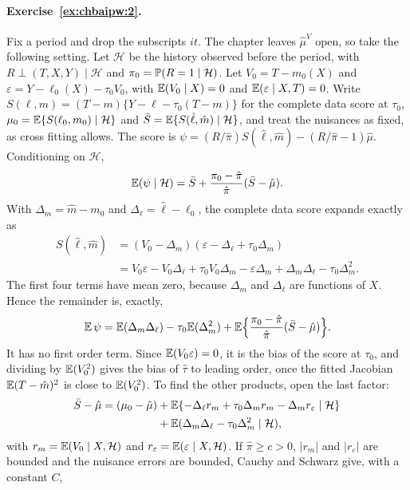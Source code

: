 \paragraph{Exercise~\ref{ex:chbaipw:2}.} Fix a period and drop the subscripts $it$. The chapter leaves $\hat\mu^V$ open, so take the following setting. Let $\mathcal H$ be the history observed before the period, with $R \perp (T, X, Y) \mid \mathcal H$ and $\pi_0 = \mathbb{P}(R = 1 \mid \mathcal H)$. Let $V_0 = T - m_0(X)$ and $\varepsilon = Y - \ell_0(X) - \tau_0V_0$, with $\mathbb{E}(V_0 \mid X) = 0$ and $\mathbb{E}(\varepsilon \mid X, T) = 0$. Write $S(\ell, m) = (T - m)\{Y - \ell - \tau_0(T - m)\}$ for the complete data score at $\tau_0$, $\mu_0 = \mathbb{E}\{S(\ell_0, m_0) \mid \mathcal H\}$ and $\bar S = \mathbb{E}\{S(\hat\ell, \hat m) \mid \mathcal H\}$, and treat the nuisances as fixed, as cross fitting allows. The score is $\psi = (R/\hat\pi)S(\hat\ell, \hat m) - (R/\hat\pi - 1)\hat\mu$. Conditioning on $\mathcal H$,
\[
\mathbb{E}(\psi \mid \mathcal H) = \bar S + \frac{\pi_0 - \hat\pi}{\hat\pi}(\bar S - \hat\mu).
\]
With $\Delta_m = \hat m - m_0$ and $\Delta_\ell = \hat\ell - \ell_0$, the complete data score expands exactly as
\[
\begin{split}
S(\hat\ell, \hat m) &= (V_0 - \Delta_m)(\varepsilon - \Delta_\ell + \tau_0\Delta_m)\\ &= V_0\varepsilon - V_0\Delta_\ell + \tau_0V_0\Delta_m - \varepsilon\Delta_m + \Delta_m\Delta_\ell - \tau_0\Delta_m^2.
\end{split}
\]
The first four terms have mean zero, because $\Delta_m$ and $\Delta_\ell$ are functions of $X$. Hence the remainder is, exactly,
\[
\mathbb{E}\,\psi = \mathbb{E}(\Delta_m\Delta_\ell) - \tau_0\mathbb{E}(\Delta_m^2) + \mathbb{E}\Bigl\{\frac{\pi_0 - \hat\pi}{\hat\pi}(\bar S - \hat\mu)\Bigr\}.
\]
It has no first order term. Since $\mathbb{E}(V_0\varepsilon) = 0$, it is the bias of the score at $\tau_0$, and dividing by $\mathbb{E}(V_0^2)$ gives the bias of $\hat\tau$ to leading order, once the fitted Jacobian $\mathbb{E}(T - \hat m)^2$ is close to $\mathbb{E}(V_0^2)$. To find the other products, open the last factor:
\[
\begin{split}
\bar S - \hat\mu = (\mu_0 - \hat\mu) &+ \mathbb{E}\{-\Delta_\ell r_m + \tau_0\Delta_mr_m - \Delta_mr_\varepsilon \mid \mathcal H\} \\
&+ \mathbb{E}(\Delta_m\Delta_\ell - \tau_0\Delta_m^2 \mid \mathcal H),
\end{split}
\]
with $r_m = \mathbb{E}(V_0 \mid X, \mathcal H)$ and $r_\varepsilon = \mathbb{E}(\varepsilon \mid X, \mathcal H)$. If $\hat\pi \geq c > 0$, $|r_m|$ and $|r_\varepsilon|$ are bounded and the nuisance errors are bounded, Cauchy and Schwarz give, with a constant $C$,
